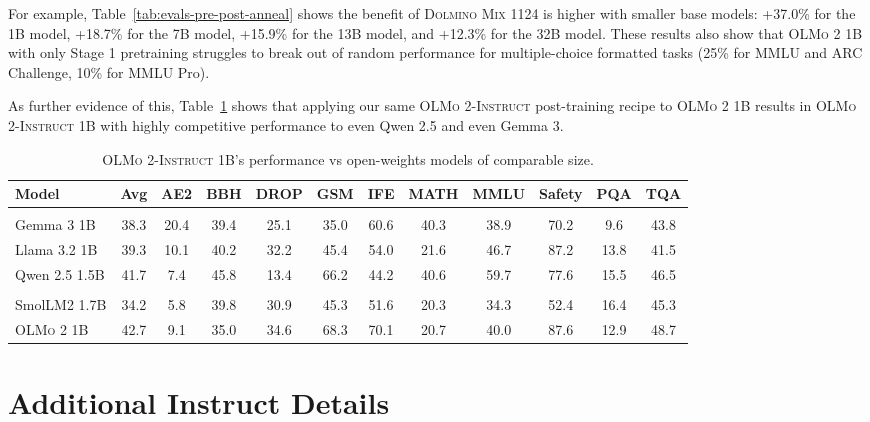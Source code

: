 \documentclass[table]{ai2style/ai2}
\newcommand{\olmotoo}{\textsc{OLMo 2}\xspace}
\newcommand{\olmotooinstruct}{\textsc{OLMo 2-Instruct}\xspace}
\newcommand{\dolminos}{\textsc{Dolmino Mix 1124}\xspace}
\begin{document}
For example, Table~\ref{tab:evals-pre-post-anneal} shows the benefit of \dolminos is higher with smaller base models:
+37.0\% for the 1B model, +18.7\% for the 7B model, +15.9\% for the 13B model, and +12.3\% for the 32B model.
These results also show that \olmotoo 1B with only Stage 1 pretraining struggles to break out of random performance for multiple-choice formatted tasks (25\% for MMLU and ARC Challenge, 10\% for MMLU Pro). 

As further evidence of this, Table~\ref{tab:instruct_results_1b} shows that applying our same \olmotooinstruct post-training recipe to \olmotoo 1B results in \olmotooinstruct 1B with highly competitive performance to even Qwen 2.5 and even Gemma 3. 

\begin{table}[t]
\centering
\setlength\tabcolsep{3pt}
{\small
\begin{tabular}{lccccccccccc}
\toprule
    \textbf{Model} & 
    \textbf{Avg} & 
    \textbf{AE2} & 
    \textbf{BBH} & 
    \textbf{DROP} & 
    \textbf{GSM} & 
    \textbf{IFE} & 
    \textbf{MATH} & 
    \textbf{MMLU} & 
    \textbf{Safety} & 
    \textbf{PQA} & 
    \textbf{TQA}
\\
\midrule
\rowcolor{ai2offwhite}\multicolumn{12}{c}{\textbf{Open weights models 1–2B Parameters}} \\
Gemma 3 1B & 38.3 & 20.4 & 39.4 & 25.1 & 35.0 & 60.6 & 40.3 & 38.9 & 70.2 & 9.6 & 43.8 \\
Llama 3.2 1B & 39.3 & 10.1 & 40.2 & 32.2 & 45.4 & 54.0 & 21.6 & 46.7 & 87.2 & 13.8 & 41.5 \\
Qwen 2.5 1.5B & 41.7  & 7.4 & 45.8 & 13.4 & 66.2 & 44.2 & 40.6 & 59.7 & 77.6 & 15.5 & 46.5 \\
\rowcolor{ai2offwhite}
\multicolumn{12}{c}{\textbf{Fully-open models}} \\
SmolLM2 1.7B & 34.2  & 5.8 & 39.8 & 30.9 & 45.3 & 51.6 & 20.3 & 34.3 & 52.4 & 16.4 & 45.3 \\
\rowcolor{ai2lightpink} \olmotoo 1B     & 42.7    & 9.1       & 35.0   & 34.6   & 68.3   & 70.1   & 20.7   & 40.0   & 87.6        & 12.9   & 48.7 \\
\bottomrule
\end{tabular}
}
\caption{
\olmotooinstruct 1B's performance vs open-weights models of comparable size.
}
\label{tab:instruct_results_1b}
\end{table}

\clearpage
\section{Additional Instruct Details}
\end{document}
